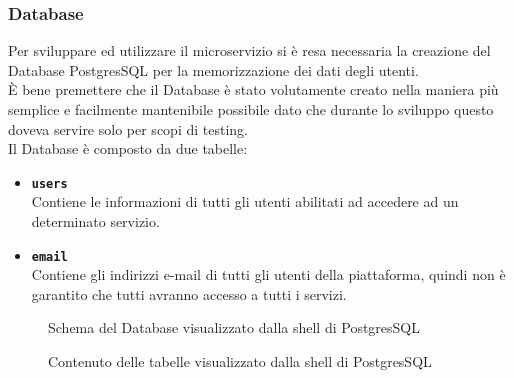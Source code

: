 \subsubsection{Database}
Per sviluppare ed utilizzare il microservizio si è resa necessaria la creazione del Database PostgresSQL per la memorizzazione dei dati degli utenti.\\
È bene premettere che il Database è stato volutamente creato nella maniera più semplice e facilmente mantenibile possibile dato che durante lo sviluppo questo doveva servire solo per scopi di testing.\\
Il Database è composto da due tabelle:
\begin{itemize}
		\item \textbf{\texttt{users}}\\ Contiene le informazioni di tutti gli utenti abilitati ad accedere ad un determinato servizio.
		\item \textbf{\texttt{email}}\\ Contiene gli indirizzi e-mail di tutti gli utenti della piattaforma, quindi non è garantito che tutti avranno accesso a tutti i servizi.
\end{itemize}
\begin{figure}[ht]
	\centering
	\caption{Schema del Database visualizzato dalla shell di PostgresSQL}
	\label{fig:one}
\end{figure}
\begin{figure}[ht]
	\centering
	\caption{Contenuto delle tabelle visualizzato dalla shell di PostgresSQL}
	\label{fig:one}
\end{figure}

